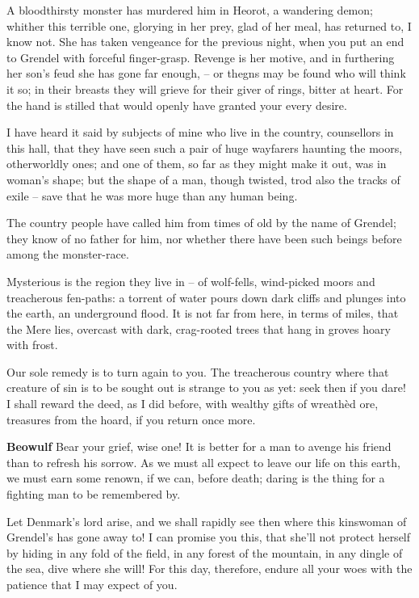 \documentclass[a4paper]{article}
\begin{document}
{A bloodthirsty monster has murdered him in Heorot,
a wandering demon; whither this terrible one,
glorying in her prey, glad of her meal,
has returned to, I know not. She has taken vengeance
for the previous night, when you put an end to Grendel
with forceful finger-grasp. Revenge is her motive,
and in furthering her son's feud she has gone far enough,
– or thegns may be found who will think it so;
in their breasts they will grieve for their giver of rings,
bitter at heart. For the hand is stilled
that would openly have granted your every desire.

I have heard it said by subjects of mine
who live in the country, counsellors in this hall,
that they have seen such a pair
of huge wayfarers haunting the moors,
otherworldly ones; and one of them,
so far as they might make it out,
was in woman's shape; but the shape of a man,
though twisted, trod also the tracks of exile
– save that he was more huge than any human being.

The country people have called him from times of old
by the name of Grendel; they know of no father for him,
nor whether there have been such beings before
among the monster-race.

\newpage
Mysterious is the region
they live in – of wolf-fells, wind-picked moors
and treacherous fen-paths: a torrent of water
pours down dark cliffs and plunges into the earth,
an underground flood. It is not far from here,
in terms of miles, that the Mere lies,
overcast with dark, crag-rooted trees
that hang in groves hoary with frost.

Our sole remedy
is to turn again to you. The treacherous country
where that creature of sin is to be sought out
is strange to you as yet: seek then if you dare!
I shall reward the deed, as I did before,
with wealthy gifts of wreathèd ore,
treasures from the hoard, if you return once more.

\textbf{Beowulf} Bear your grief, wise one! It is better for a man
to avenge his friend than to refresh his sorrow.
As we must all expect to leave
our life on this earth, we must earn some renown,
if we can, before death; daring is the thing
for a fighting man to be remembered by.

Let Denmark's lord arise, and we shall rapidly see then
where this kinswoman of Grendel's has gone away to!
I can promise you this, that she'll not protect herself by hiding
in any fold of the field, in any forest of the mountain,
in any dingle of the sea, dive where she will!
For this day, therefore, endure all your woes
with the patience that I may expect of you.

}
\end{document}
